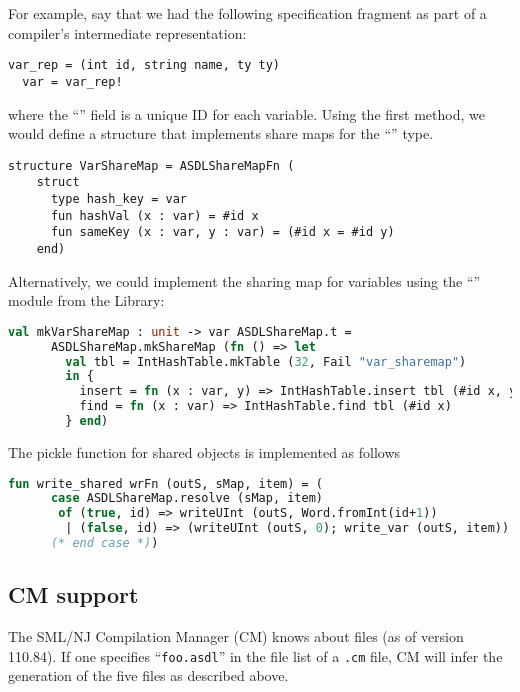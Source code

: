For example, say that we had the following \asdl{} specification fragment
as part of a compiler's intermediate representation:
\begin{code}
\begin{lstlisting}[language=asdl]
  var_rep = (int id, string name, ty ty)
  var = var_rep!
\end{lstlisting}%
\end{code}%
where the ``'' field is a unique ID for each variable.
Using the first method, we would define a structure that implements
share maps for the ``'' type.
\begin{code}
\begin{lstlisting}[language=asdl]
structure VarShareMap = ASDLShareMapFn (
    struct
      type hash_key = var
      fun hashVal (x : var) = #id x
      fun sameKey (x : var, y : var) = (#id x = #id y)
    end)
\end{lstlisting}%
\end{code}%
Alternatively, we could implement the sharing map for variables using the
``'' module from the \smlnj{} Library:
\begin{code}
\begin{lstlisting}[language=sml]
val mkVarShareMap : unit -> var ASDLShareMap.t =
      ASDLShareMap.mkShareMap (fn () => let
        val tbl = IntHashTable.mkTable (32, Fail "var_sharemap")
        in {
          insert = fn (x : var, y) => IntHashTable.insert tbl (#id x, y),
          find = fn (x : var) => IntHashTable.find tbl (#id x)
        } end)
\end{lstlisting}%
\end{code}%
%
The pickle function for shared objects is implemented as follows
\begin{code}
\begin{lstlisting}[language=sml]
fun write_shared wrFn (outS, sMap, item) = (
      case ASDLShareMap.resolve (sMap, item)
       of (true, id) => writeUInt (outS, Word.fromInt(id+1))
        | (false, id) => (writeUInt (outS, 0); write_var (outS, item))
      (* end case *))
\end{lstlisting}%
\end{code}%

\subsection{CM support}
The SML/NJ Compilation Manager (CM) knows about \asdl{} files (as of version 110.84).
If one specifies ``\texttt{foo.asdl}'' in the file list of a \texttt{.cm} file, CM will
infer the generation of the five \sml{} files as described above.

